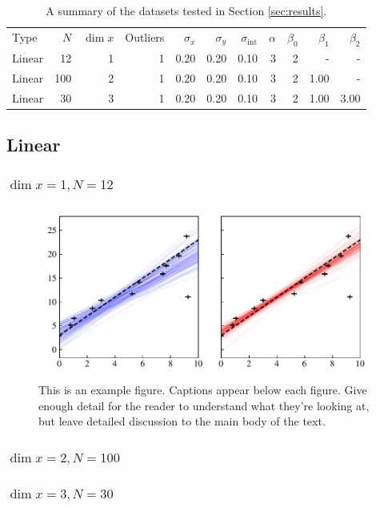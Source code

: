 \begin{table}
	\centering
	\caption{A summary of the datasets tested in Section \ref{sec:results}.}
	\label{tab:results.datasets}
    \begin{tabular}{lrrrrrrrrrr}
Type & $N$ & $\dim x$ & Outliers & $\sigma_{x}$ & $\sigma_{y}$ & $\sigma_{\text{int}}$ & $\alpha$ & $\beta_0$ & $\beta_1$ & $\beta_2$ \\
Linear & 12 & 1 & 1 & 0.20 & 0.20 & 0.10 & 3 & 2 & - & - \\
Linear & 100 & 2 & 1 & 0.20 & 0.20 & 0.10 & 3 & 2 & 1.00 & - \\
Linear & 30 & 3 & 1 & 0.20 & 0.20 & 0.10 & 3 & 2 & 1.00 & 3.00 \\
\end{tabular}

\end{table}

\subsection{ Linear }

\subsubsection{$\dim x = 1, N = 12$}

\begin{figure}
	\includegraphics[width=\textwidth]{graphics/regression_Linear_1D1_cauchy.pdf}
    \caption{This is an example figure. Captions appear below each figure.
	Give enough detail for the reader to understand what they're looking at,
	but leave detailed discussion to the main body of the text.}
    \label{fig:example_widefigure}
\end{figure}

\subsubsection{$\dim x = 2, N = 100$}


\subsubsection{$\dim x = 3, N = 30$}


